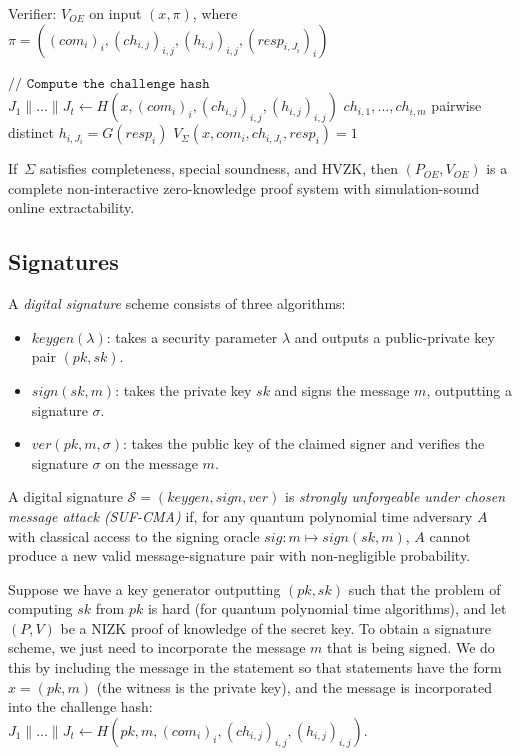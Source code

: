 \documentclass[runningheads,a4paper]{llncs}
\begin{document}
\begin{algorithm}
\caption{Verifier: $V_{OE}$ on input $(x,\pi)$, where \newline $\pi = ((com_i)_i, (ch_{i,j})_{i,j}, (h_{i,j})_{i,j}, (resp_{i,J_i})_i)$}
\begin{algorithmic}
\STATE $\texttt{// Compute the challenge hash}$
\STATE $J_1 \| \dots \| J_t \leftarrow H(x, (com_i)_i, (ch_{i,j})_{i,j}, (h_{i,j})_{i,j})$ 
\vspace{2mm}
	 $ch_{i,1},\dots,ch_{i,m}$ pairwise distinct
	 $h_{i,J_i} = G(resp_i)$
	 $V_\Sigma(x,com_i, ch_{i,J_i}, resp_i) = 1$
\ENDFOR
{}
\ENDIF
\end{algorithmic}
\end{algorithm}

\begin{theorem}
If $\,\Sigma$ satisfies completeness, special soundness, and HVZK, then $(P_{OE}, V_{OE})$ is a complete non-interactive zero-knowledge proof system with simulation-sound online extractability.
\end{theorem}

\subsection{Signatures}
A \emph{digital signature} scheme consists of three algorithms:
\begin{itemize}
	\item 
	$keygen(\lambda)$: takes a security parameter $\lambda$ and outputs a public-private key pair $(pk,sk)$.

	\item
	$sign(sk, m)$: takes the private key $sk$ and signs the message $m$, outputting a signature $\sigma$.

	\item
	$ver(pk, m, \sigma)$: takes the public key of the claimed signer and verifies the signature $\sigma$ on the message $m$.
\end{itemize}

A digital signature $\mathcal{S} = (keygen, sign, ver)$ is \emph{strongly unforgeable under chosen message attack (SUF-CMA)} if, for any quantum polynomial time adversary $A$ with classical access to the signing oracle $sig: m \mapsto sign(sk,m)$, $A$ cannot produce a new valid message-signature pair with non-negligible probability.


Suppose we have a key generator outputting $(pk,sk)$ such that the problem of computing $sk$ from $pk$ is hard (for quantum polynomial time algorithms), and let $(P,V)$ be a NIZK proof of knowledge of the secret key. To obtain a signature scheme, we just need to incorporate the message $m$ that is being signed. We do this by including the message in the statement so that statements have the form $x = (pk,m)$ (the witness is the private key), and the message is incorporated into the challenge hash: $J_1 \| \dots \| J_t \leftarrow H(pk,m,(com_i)_i, (ch_{i,j})_{i,j}, (h_{i,j})_{i,j})$. 
\end{document}
